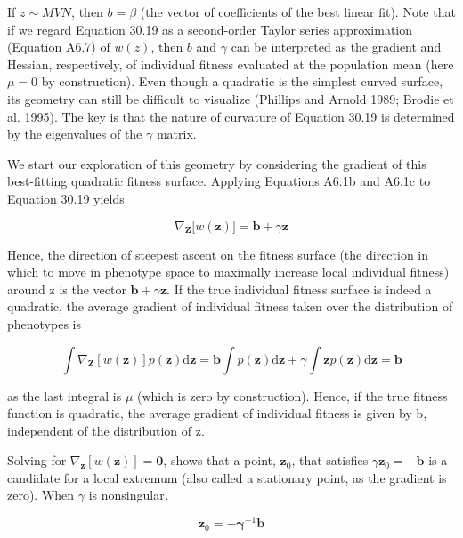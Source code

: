 \documentclass{article}
\begin{document}
If  $ z \sim MVN $, then  $ b = \beta $ (the vector of coefficients of the best linear fit). Note that if we regard Equation 30.19 as a second-order Taylor series approximation (Equation A6.7) of  $ w(z) $, then  $ b $ and  $ \gamma $ can be interpreted as the gradient and Hessian, respectively, of individual fitness evaluated at the population mean (here  $ \mu = 0 $ by construction). Even though a quadratic is the simplest curved surface, its geometry can still be difficult to visualize (Phillips and Arnold 1989; Brodie et al. 1995). The key is that the nature of curvature of Equation 30.19 is determined by the eigenvalues of the  $ \gamma $ matrix.

We start our exploration of this geometry by considering the gradient of this best-fitting quadratic fitness surface. Applying Equations A6.1b and A6.1c to Equation 30.19 yields

\begin{equation}
\nabla_{\mathbf{Z}}\big[w(\mathbf{z})\big]=\mathbf{b}+\gamma\mathbf{z}
\tag{30.20a}
\label{eq:30_20a}
\end{equation}

Hence, the direction of steepest ascent on the fitness surface (the direction in which to move in phenotype space to maximally increase local individual fitness) around z is the vector  $ \mathbf{b} + \gamma \mathbf{z} $. If the true individual fitness surface is indeed a quadratic, the average gradient of individual fitness taken over the distribution of phenotypes is

\begin{equation}
\int\nabla_{\mathbf{Z}}[w(\mathbf{z})]p(\mathbf{z})\mathrm{d}\mathbf{z}=\mathbf{b}\int p(\mathbf{z})\mathrm{d}\mathbf{z}+\gamma\int\mathbf{z}p(\mathbf{z})\mathrm{d}\mathbf{z}=\mathbf{b}
\tag{30.20b}
\label{eq:30_20b}
\end{equation}

as the last integral is  $ \mu $ (which is zero by construction). Hence, if the true fitness function is quadratic, the average gradient of individual fitness is given by b, independent of the distribution of z.

Solving for  $ \nabla_{\mathbf{z}}[w(\mathbf{z})] = \mathbf{0} $, shows that a point,  $ \mathbf{z}_0 $, that satisfies  $ \gamma \mathbf{z}_0 = -\mathbf{b} $ is a candidate for a local extremum (also called a stationary point, as the gradient is zero). When  $ \gamma $ is nonsingular,

\begin{equation}
\mathbf{z}_{0}=-\boldsymbol{\gamma}^{-1}\mathbf{b}
\tag{30.21a}
\label{eq:30_21a}
\end{equation}
\end{document}
